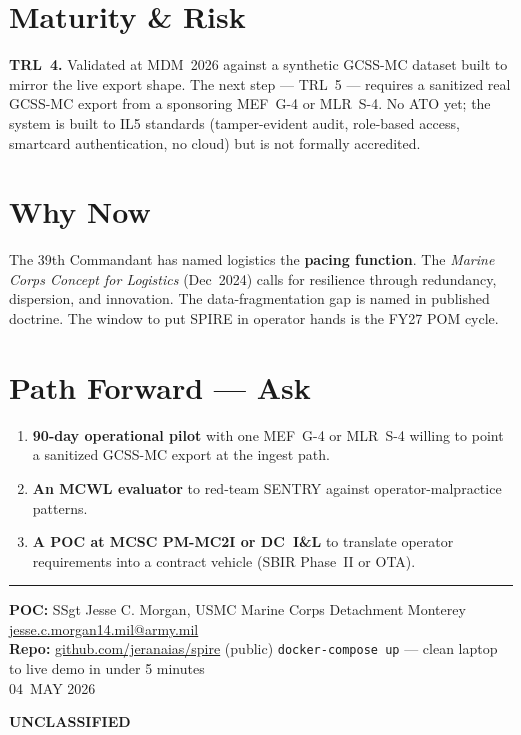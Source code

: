 \documentclass[10.5pt]{extarticle}
\newcommand{\classband}[0]{%
  \begin{center}\textbf{UNCLASSIFIED}\end{center}%
}
\begin{document}
\section*{Maturity \& Risk}
\textbf{TRL~4.} Validated at MDM~2026 against a synthetic GCSS-MC
dataset built to mirror the live export shape. The next step ---
TRL~5 --- requires a sanitized real GCSS-MC export from a sponsoring
MEF~G-4 or MLR~S-4. No ATO yet; the system is built to IL5 standards
(tamper-evident audit, role-based access, smartcard authentication,
no cloud) but is not formally accredited.

\section*{Why Now}
The 39th Commandant has named logistics the \textbf{pacing function}. The
\textit{Marine Corps Concept for Logistics} (Dec~2024) calls for resilience
through redundancy, dispersion, and innovation. The data-fragmentation gap
is named in published doctrine. The window to put SPIRE in operator hands
is the FY27 POM cycle.

\section*{Path Forward --- Ask}
\begin{enumerate}
  \item \textbf{90-day operational pilot} with one MEF~G-4 or MLR~S-4
    willing to point a sanitized GCSS-MC export at the ingest path.
  \item \textbf{An MCWL evaluator} to red-team SENTRY against
    operator-malpractice patterns.
  \item \textbf{A POC at MCSC PM-MC2I or DC~I\&L} to translate operator
    requirements into a contract vehicle (SBIR Phase~II or OTA).
\end{enumerate}

\vfill

\noindent\rule{\linewidth}{0.4pt}

\begin{center}
{\fontsize{9.5pt}{11pt}\selectfont
\textbf{POC:} SSgt Jesse C. Morgan, USMC {\textperiodcentered} Marine Corps Detachment Monterey {\textperiodcentered} \href{mailto:jesse.c.morgan14.mil@army.mil}{jesse.c.morgan14.mil@army.mil}\\
\textbf{Repo:} \href{https://github.com/jeranaias/spire}{github.com/jeranaias/spire} (public) {\textperiodcentered} \texttt{docker-compose up} --- clean laptop to live demo in under 5 minutes\\[3pt]
{\color{spireMuted}04~MAY 2026}
}
\end{center}

\classband
\end{document}
